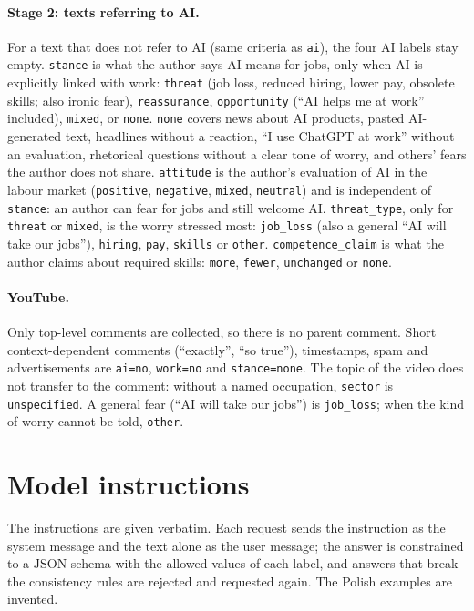 \documentclass[11pt]{article}
\begin{document}
\paragraph{Stage 2: texts referring to AI.} For a text that does not refer to
AI (same criteria as \texttt{ai}), the four AI labels stay empty.
\texttt{stance} is what the author says AI means for jobs, only when AI is
explicitly linked with work: \texttt{threat} (job loss, reduced hiring,
lower pay, obsolete skills; also ironic fear), \texttt{reassurance},
\texttt{opportunity} (``AI helps me at work'' included), \texttt{mixed}, or
\texttt{none}. \texttt{none} covers news about AI products, pasted
AI-generated text, headlines without a reaction, ``I use ChatGPT at work''
without an evaluation, rhetorical questions without a clear tone of worry,
and others' fears the author does not share. \texttt{attitude} is the
author's evaluation of AI in the labour market (\texttt{positive},
\texttt{negative}, \texttt{mixed}, \texttt{neutral}) and is independent of
\texttt{stance}: an author can fear for jobs and still welcome AI.
\texttt{threat\_type}, only for \texttt{threat} or \texttt{mixed}, is the
worry stressed most: \texttt{job\_loss} (also a general ``AI will take our
jobs''), \texttt{hiring}, \texttt{pay}, \texttt{skills} or \texttt{other}.
\texttt{competence\_claim} is what the author claims about required skills:
\texttt{more}, \texttt{fewer}, \texttt{unchanged} or \texttt{none}.

\paragraph{YouTube.} Only top-level comments are collected, so there is no
parent comment. Short context-dependent comments (``exactly'', ``so
true''), timestamps, spam and advertisements are \texttt{ai=no},
\texttt{work=no} and \texttt{stance=none}. The topic of the video does not
transfer to the comment: without a named occupation, \texttt{sector} is
\texttt{unspecified}. A general fear (``AI will take our jobs'') is
\texttt{job\_loss}; when the kind of worry cannot be told, \texttt{other}.

\section{Model instructions}
\label{app:prompts}

The instructions are given verbatim. Each request sends the instruction as
the system message and the text alone as the user message; the answer is
constrained to a JSON schema with the allowed values of each label, and
answers that break the consistency rules are rejected and requested again.
The Polish examples are invented.
\end{document}
